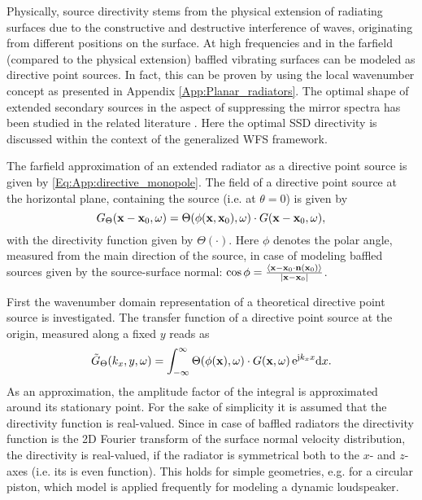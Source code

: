 Physically, source directivity stems from the physical extension of radiating surfaces due to the constructive and destructive interference of waves, originating from different positions on the surface.
At high frequencies and in the farfield (compared to the physical extension) baffled vibrating surfaces can be modeled as directive point sources.
In fact, this can be proven by using the local wavenumber concept as presented in Appendix \ref{App:Planar_radiators}.
The optimal shape of extended secondary sources in the aspect of suppressing the mirror spectra has been studied in the related literature \cite{Verheijen1997:phd}.
Here the optimal SSD directivity is discussed within the context of the generalized WFS framework.

The farfield approximation of an extended radiator as a directive point source is given by \eqref{Eq:App:directive_monopole}.
The field of a directive point source at the horizontal plane, containing the source (i.e. at $\theta = 0$) is given by
\begin{equation}
G_{\Theta}(\mathbf{x}-\mathbf{x}_0,\omega) = \Theta(\phi(\mathbf{x},\mathbf{x}_0),\omega) \cdot
G(\mathbf{x}-\mathbf{x}_0,\omega),
\end{equation}
with the directivity function given by $\Theta(\cdot)$. 
Here $\phi$ denotes the polar angle, measured from the main direction of the source, in case of modeling baffled sources given by the source-surface normal: $\cos \phi = \frac{\left< \mathbf{x}-\mathbf{x}_0 \cdot \mathbf{n}(\mathbf{x}_0) \right>}{|\mathbf{x}-\mathbf{x}_0|}$.

First the wavenumber domain representation of a theoretical directive point source is investigated.
The transfer function of a directive point source at the origin, measured along a fixed $y$ reads as 
\begin{equation}
\tilde{G}_{\Theta}(k_x,y,\omega) = \int_{-\infty}^{\infty} \Theta(\phi(\mathbf{x}),\omega) \cdot
G(\mathbf{x},\omega) \, \mathrm{e}^{\mathrm{j} k_x x} \mathrm{d} x.
\end{equation}
As an approximation, the amplitude factor of the integral is approximated around its stationary point.
For the sake of  simplicity it is assumed that the directivity function is real-valued.
Since in case of baffled radiators the directivity function is the 2D Fourier transform of the surface normal velocity distribution, the directivity is real-valued, if the radiator is symmetrical both to the $x$- and $z$-axes (i.e. its is even function).
This holds for simple geometries, e.g. for a circular piston, which model is applied frequently for modeling a dynamic loudspeaker.

